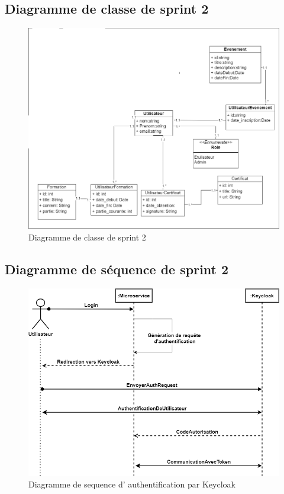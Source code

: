 \documentclass[a4paper, 11pt, openany]{report}
\begin{document}
\subsection{Diagramme de classe de sprint 2}
\begin{figure}[H]
\centering
\includegraphics[width=\textwidth]{sprint2-class.png} 
\caption{Diagramme de classe de sprint 2}
\label{fig:s2_class}
\end{figure}

\subsection{Diagramme de séquence de sprint 2}


\begin{figure}[H]
\centering
\includegraphics[width=\textwidth]{keycloak-seq.png} 
\caption{Diagramme de sequence d' authentification par Keycloak}
\label{fig:s2_auth}
\end{figure}
\end{document}
